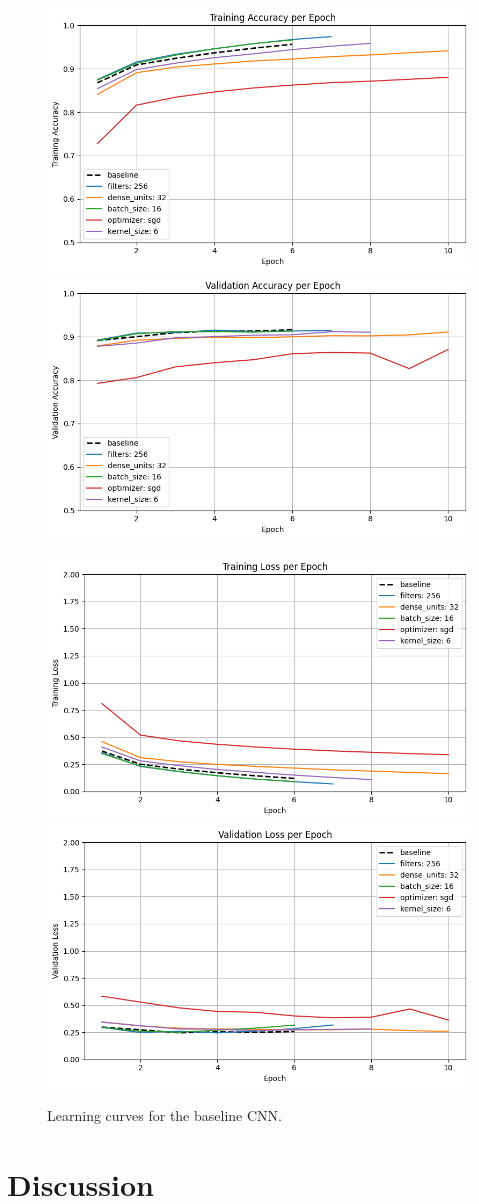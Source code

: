 \documentclass[12pt]{article}
\begin{document}
\begin{figure}[ht]
  \centering
    {\includegraphics[width=.48\linewidth]{training-accuracy.png}}
  \hfill
    {\includegraphics[width=.48\linewidth]{validation-accuracy.png}}

  \vspace{0.8em}

    {\includegraphics[width=.48\linewidth]{training-loss.png}}
  \hfill
    {\includegraphics[width=.48\linewidth]{validation-loss.png}}
  \caption{Learning curves for the baseline CNN.}
  \label{fig:learningcurves}
\end{figure}
\newpage
\section{Discussion}
\end{document}
